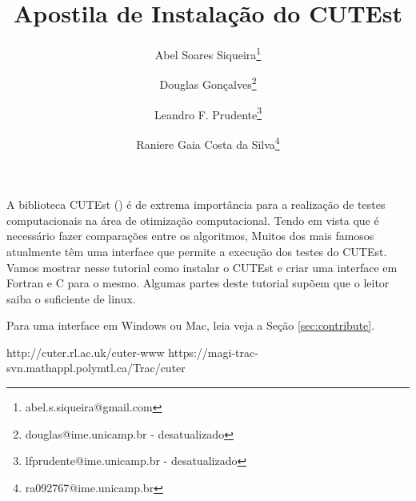 \documentclass[letterpaper,11pt]{article}
\title{Apostila de Instalação do CUTEst}
\author{
Abel Soares Siqueira\footnote{abel.s.siqueira@gmail.com} \and
Douglas Gonçalves\footnote{douglas@ime.unicamp.br - desatualizado} \and
Leandro F. Prudente\footnote{lfprudente@ime.unicamp.br - desatualizado} \and
Raniere Gaia Costa da Silva\footnote{ra092767@ime.unicamp.br}}
\numberwithin{equation}{section}
\begin{document}
\maketitle
\tableofcontents
\vspace{1 cm}

A biblioteca CUTEst (\cite{bib:cuter1,bib:cuter2,bib:cutest}) é de extrema
importância para a realização de testes computacionais na área de otimização
computacional.  Tendo em vista que é necessário fazer comparações entre os
algoritmos, Muitos dos mais famosos atualmente têm uma interface que permite a
execução dos testes do CUTEst. Vamos mostrar nesse tutorial como instalar o
CUTEst e criar uma interface em Fortran e C para o mesmo. Algumas partes deste
tutorial supõem que o leitor saiba o suficiente de linux.

Para uma interface em Windows ou Mac, leia veja a Seção \ref{sec:contribute}.







\appendix


\begin{thebibliography}{3}
 http://cuter.rl.ac.uk/cuter-www
 https://magi-trac-svn.mathappl.polymtl.ca/Trac/cuter

\end{thebibliography}
\end{document}
